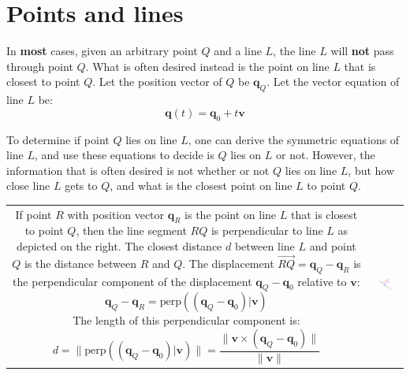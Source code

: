 \documentclass{article}
\begin{document}
\section*{Points and lines}

In {\bf most} cases, given an arbitrary point \(Q\) and a line \(L\), the line \(L\) will {\bf not} pass through point \(Q\). What is often desired instead is the point on line \(L\) that is closest to point \(Q\).  Let the position vector of \(Q\) be \(\mathbf{q}_Q\). Let the vector equation of line \(L\) be:
\[\mathbf{q}(t) = \mathbf{q}_0 + t \mathbf{v}\]

To determine if point \(Q\) lies on line \(L\), one can derive the symmetric equations of line \(L\), and use these equations to decide is \(Q\) lies on \(L\) or not. However, the information that is often desired is not whether or not \(Q\) lies on line \(L\), but how close line \(L\) gets to \(Q\), and what is the closest point on line \(L\) to point \(Q\).

\begin{tabular}{cc}
\parbox{0.5\textwidth}{
If point \(R\) with position vector \(\mathbf{q}_R\) is the point on line \(L\) that is closest to point \(Q\), then the line segment \(RQ\) is perpendicular to line \(L\) as depicted on the right. The closest distance \(d\) between line \(L\) and point \(Q\) is the distance between \(R\) and \(Q\). 
The displacement \(\overrightarrow{RQ} = \mathbf{q}_Q - \mathbf{q}_R\) is the perpendicular component of the displacement \(\mathbf{q}_Q - \mathbf{q}_0\) relative to \(\mathbf{v}\):
\[\mathbf{q}_Q - \mathbf{q}_R = \text{perp}((\mathbf{q}_Q - \mathbf{q}_0)|\mathbf{v})\]
The length of this perpendicular component is:
\[d = \|\text{perp}((\mathbf{q}_Q - \mathbf{q}_0)|\mathbf{v})\| = \frac{\|\mathbf{v} \times (\mathbf{q}_Q - \mathbf{q}_0)\|}{\|\mathbf{v}\|}\] 
} & \parbox{0.5\textwidth}{
\includegraphics[width = 0.5\textwidth]{point_line_closest_distance}
}
\end{tabular}
\end{document}
